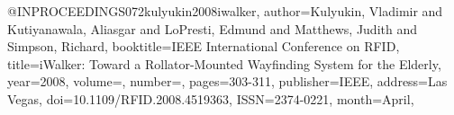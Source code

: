 @INPROCEEDINGS{072kulyukin2008iwalker,
author={Kulyukin, Vladimir and Kutiyanawala, Aliasgar and LoPresti, Edmund and Matthews, Judith and Simpson, Richard},
booktitle={IEEE International Conference on RFID}, 
title={iWalker: Toward a Rollator-Mounted Wayfinding System for the Elderly}, 
year={2008},
volume={},
number={},
pages={303-311},
publisher={IEEE},
address={Las Vegas},
doi={10.1109/RFID.2008.4519363},
ISSN={2374-0221},
month={April},}